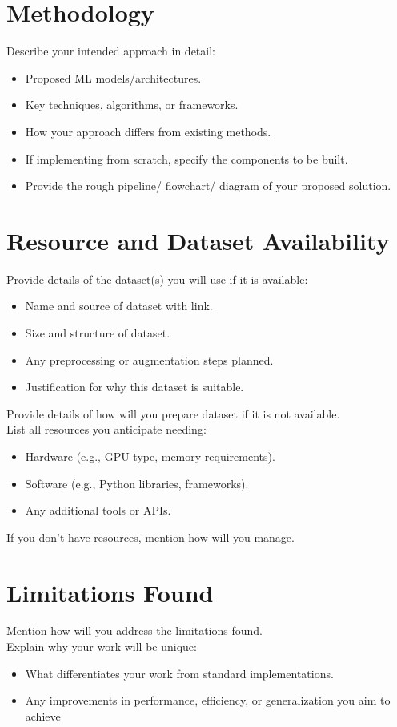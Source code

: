 \documentclass[lettersize,journal]{IEEEtran}
\begin{document}
\section{Methodology}
Describe your intended approach in detail:
\begin{itemize}
    \item Proposed ML models/architectures.
    \item Key techniques, algorithms, or frameworks.
    \item How your approach differs from existing methods.
    \item If implementing from scratch, specify the components to be built.
    \item Provide the rough pipeline/ flowchart/ diagram of your proposed solution. 
\end{itemize}


\section{Resource and Dataset Availability}
Provide details of the dataset(s) you will use if it is available:
\begin{itemize}
    \item Name and source of dataset with link.
    \item Size and structure of dataset.
    \item Any preprocessing or augmentation steps planned.
    \item Justification for why this dataset is suitable.
\end{itemize}



Provide details of how will you prepare dataset if it is not available.\\

List all resources you anticipate needing:
\begin{itemize}
    \item Hardware (e.g., GPU type, memory requirements).
    \item  Software (e.g., Python libraries, frameworks).
    \item Any additional tools or APIs.
\end{itemize}

If you don't have resources, mention how will you manage.


\section{Limitations Found}
Mention how will you address the limitations found.\\
Explain why your work will be unique:
\begin{itemize}
    \item What differentiates your work from standard implementations.
    \item Any improvements in performance, efficiency, or generalization you aim to achieve
\end{itemize}
\end{document}
